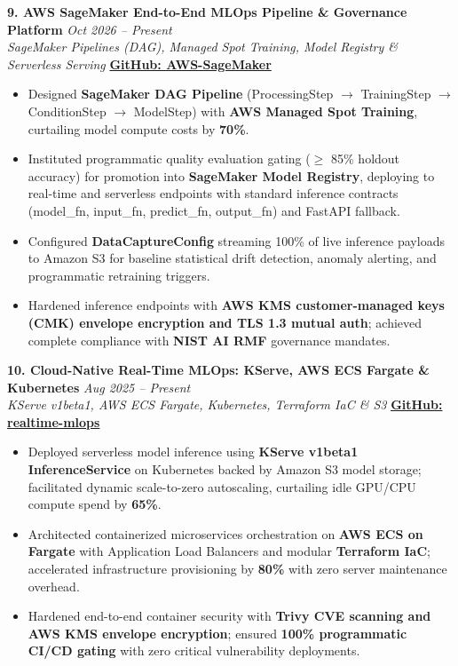 \documentclass[9.5pt,a4paper]{article}
\begin{document}
\vspace{2.0pt}
\noindent\textbf{9. AWS SageMaker End-to-End MLOps Pipeline \& Governance Platform} \hfill {\small\textit{Oct 2026 -- Present}}\\
\textit{SageMaker Pipelines (DAG), Managed Spot Training, Model Registry \& Serverless Serving} \hfill {\footnotesize\href{https://github.com/KishorKumarParoi/AWS-SageMaker}{\textbf{GitHub: AWS-SageMaker}}}
\begin{itemize}
    \item Designed \textbf{SageMaker DAG Pipeline} (ProcessingStep $\to$ TrainingStep $\to$ ConditionStep $\to$ ModelStep) with \textbf{AWS Managed Spot Training}, curtailing model compute costs by \textbf{70\%}.
    \item Instituted programmatic quality evaluation gating ($\ge$ 85\% holdout accuracy) for promotion into \textbf{SageMaker Model Registry}, deploying to real-time and serverless endpoints with standard inference contracts (model\_fn, input\_fn, predict\_fn, output\_fn) and FastAPI fallback.
    \item Configured \textbf{DataCaptureConfig} streaming 100\% of live inference payloads to Amazon S3 for baseline statistical drift detection, anomaly alerting, and programmatic retraining triggers.
    \item Hardened inference endpoints with \textbf{AWS KMS customer-managed keys (CMK) envelope encryption and TLS 1.3 mutual auth}; achieved complete compliance with \textbf{NIST AI RMF} governance mandates.
\end{itemize}

\vspace{2.0pt}
\noindent\textbf{10. Cloud-Native Real-Time MLOps: KServe, AWS ECS Fargate \& Kubernetes} \hfill {\small\textit{Aug 2025 -- Present}}\\
\textit{KServe v1beta1, AWS ECS Fargate, Kubernetes, Terraform IaC \& S3} \hfill {\footnotesize\href{https://github.com/KishorKumarParoi/realtime-mlops}{\textbf{GitHub: realtime-mlops}}}
\begin{itemize}
    \item Deployed serverless model inference using \textbf{KServe v1beta1 InferenceService} on Kubernetes backed by Amazon S3 model storage; facilitated dynamic scale-to-zero autoscaling, curtailing idle GPU/CPU compute spend by \textbf{65\%}.
    \item Architected containerized microservices orchestration on \textbf{AWS ECS on Fargate} with Application Load Balancers and modular \textbf{Terraform IaC}; accelerated infrastructure provisioning by \textbf{80\%} with zero server maintenance overhead.
    \item Hardened end-to-end container security with \textbf{Trivy CVE scanning and AWS KMS envelope encryption}; ensured \textbf{100\% programmatic CI/CD gating} with zero critical vulnerability deployments.
\end{itemize}
\end{document}
